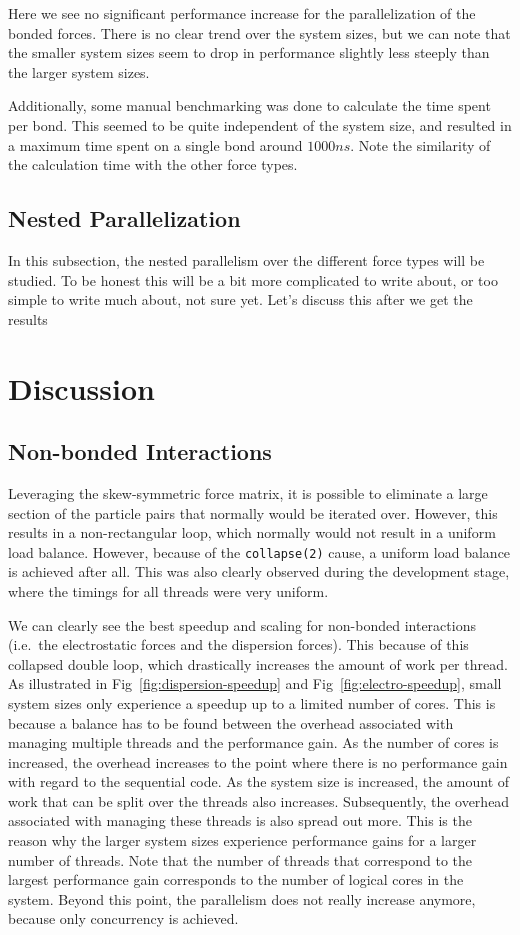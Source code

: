 \documentclass[conference]{IEEEtran}
\begin{document}
        Here we see no significant performance increase for the parallelization of the bonded forces. There is no
        clear trend over the system sizes, but we can note that the smaller system sizes seem to drop in performance
        slightly less steeply than the larger system sizes.

        Additionally, some manual benchmarking was done to calculate the time spent per bond. This
        seemed to be quite independent of the system size, and resulted in a maximum time spent on a single bond 
        around $1000 ns$. Note the similarity of the calculation time with the other force types.


    \subsection{Nested Parallelization}
    In this subsection, the nested parallelism over the different force types will be studied. To be honest this will
    be a bit more complicated to write about, or too simple to write much about, not sure yet. Let's discuss this
    after we get the results

\section{Discussion}
\subsection{Non-bonded Interactions}

Leveraging the skew-symmetric
force matrix, it is possible to eliminate a large section of the particle pairs that normally would be iterated
over. However, this results in a non-rectangular loop, which normally would not result in a uniform load balance.
However, because of the \verb|collapse(2)| cause, a uniform load balance is achieved after all. This was also
clearly observed during the development stage, where the timings for all threads were very uniform.

We can clearly see the best speedup and scaling for non-bonded interactions (i.e.\ the electrostatic forces and 
the dispersion forces). This because of this collapsed double loop, which drastically increases the amount of
work per thread. As illustrated in Fig~\ref{fig:dispersion-speedup} and Fig~\ref{fig:electro-speedup}, small system
sizes only experience a speedup up to a limited number of cores. This is because a balance has to be found between
the overhead associated with managing multiple threads and the performance gain. As the number of cores is increased,
the overhead increases to the point where there is no performance gain with regard to the sequential code. As the
system size is increased, the amount of work that can be split over the threads also increases. Subsequently, the
overhead associated with managing these threads is also spread out more. This is the reason why the larger system
sizes experience performance gains for a larger number of threads. Note that the number of threads that correspond
to the largest performance gain corresponds to the number of logical cores in the system. Beyond this point, the
parallelism does not really increase anymore, because only concurrency is achieved.
\end{document}

